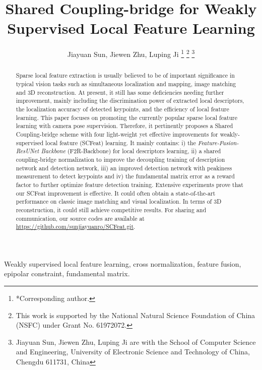 \documentclass[journal]{IEEEtran}
\begin{document}
\title{Shared Coupling-bridge for Weakly Supervised Local Feature Learning}


\author{Jiayuan Sun, Jiewen Zhu, Luping Ji
\thanks{*Corresponding author.}
\thanks{This work is supported by the National Natural Science Foundation of China (NSFC) under Grant No.
61972072.}
\thanks{Jiayuan Sun, Jiewen Zhu, Luping Ji are with the School of Computer
Science and Engineering, University of Electronic Science and Technology
of China, Chengdu 611731, China}
}

\maketitle

\begin{abstract}
Sparse local feature extraction is usually believed to be of important significance in typical vision tasks such as simultaneous localization and mapping, image matching and 3D reconstruction. 
At present, it still has some deficiencies needing further improvement, mainly including the discrimination power of extracted local descriptors, the localization accuracy of detected keypoints, and the efficiency of local feature learning.
This paper focuses on promoting the currently popular sparse local feature learning with camera pose supervision. 
Therefore, it pertinently proposes a Shared Coupling-bridge scheme with four light-weight yet effective improvements for weakly-supervised local feature (SCFeat) learning. 
It mainly contains: 
i) the \emph{Feature-Fusion-ResUNet Backbone} (F2R-Backbone) for local descriptors learning, 
ii) a shared coupling-bridge normalization to improve the decoupling training of description network and detection network,
iii) an improved detection network with peakiness measurement to detect keypoints and 
iv) the fundamental matrix error as a reward factor to further optimize feature detection training. 
Extensive experiments prove that our SCFeat improvement is effective. 
It could often obtain a state-of-the-art performance on classic image matching and visual localization. In terms of 3D reconstruction, it could still achieve competitive results. For sharing and communication, our source codes are available at \href{https://github.com/sunjiayuanro/SCFeat.git}{https://github.com/sunjiayuanro/SCFeat.git}.
\end{abstract}

\begin{IEEEkeywords}
Weakly supervised local feature learning, cross normalization, feature fusion, epipolar constraint, fundamental matrix.
\end{IEEEkeywords}
\end{document}
